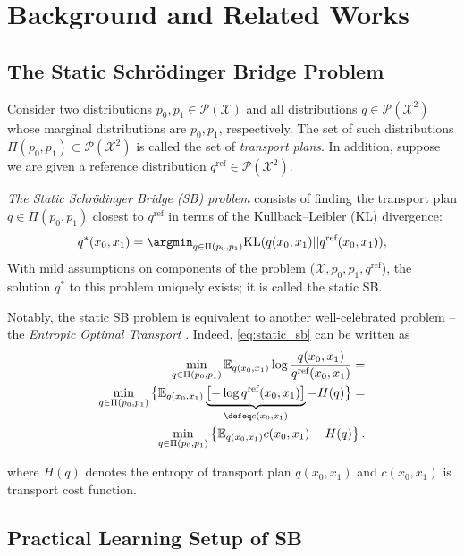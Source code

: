 \section{Background and Related Works}
\subsection{The Static Schrödinger Bridge Problem}
Consider two distributions $p_0, p_1 \in \mathcal{P}(\mathcal{X})$ and all distributions $q\in\mathcal{P}(\mathcal{X}^{2})$ whose marginal distributions are $p_0,p_1$, respectively. The set of such distributions $\Pi(p_0, p_1) \subset \mathcal{P}(\mathcal{X}^2)$ is called the set of \emph{transport plans}. In addition, suppose we are given a reference distribution $q^{\text{ref}} \in \mathcal{P}(\mathcal{X}^2)$.

\emph{The Static Schrödinger Bridge (SB) problem} \cite{schrodinger1931umkehrung, leonard2013survey} consists of finding the transport plan $q \in \Pi(p_0, p_1)$ closest to $q^{\text{ref}}$ in terms of the Kullback–Leibler (KL) divergence:
\begin{equation}
    \label{eq:static_sb}
    q^*(x_0, x_1) = \argmin_{q \in \Pi(p_0, p_1)}\text{KL}(q(x_0, x_1)||q^{\text{ref}}(x_0, x_1)),
\end{equation}
With mild assumptions on components of the problem ($\mathcal{X}, p_0, p_1, q^{\text{ref}}$), the solution $q^*$ to this problem uniquely exists; it is called the static SB.

Notably, the static SB problem is equivalent to another well-celebrated problem -- the \emph{Entropic Optimal Transport} \citep[EOT]{cuturi2013sinkhorn}. Indeed, \eqref{eq:static_sb} can be written as
\begin{eqnarray}
    \min_{q \in \Pi(p_0, p_1)}  \mathbb{E}_{q(x_0, x_1)}\log \frac{q(x_0,x_1)}{q^{\text{ref}}(x_0,x_1)}
    =
    \nonumber
    \\
    \min_{q \in \Pi(p_0, p_1)}\big\{ \mathbb{E}_{q(x_0, x_1)}\underbrace{\left[-\log q^{\text{ref}}(x_0, x_1)\right]}_{\defeq c(x_0,x_1)} - H(q)\big\}=
    \nonumber
    \\
    \min_{q \in \Pi(p_0, p_1)} \left\{ \mathbb{E}_{q(x_0, x_1)}c(x_0,x_1) - H(q)\right\}.
    \label{eq:eot}
\end{eqnarray}

where $H(q)$ denotes the entropy of transport plan $q(x_0, x_1)$ and $c(x_0,x_1)$ is transport cost function.

\subsection{Practical Learning Setup of SB}
\label{sec:background-setup-generative}

